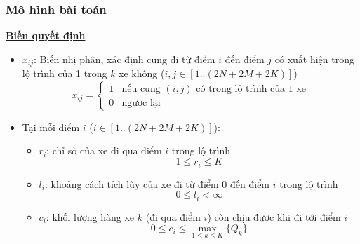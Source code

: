\documentclass{beamer}
\begin{document}
	\begin{frame}
		\frametitle{Mô hình bài toán}
		\textbf{\underline{Biến quyết định}}
		\begin{itemize}
			\item $x_{ij}$: Biến nhị phân, xác định cung đi từ điểm $i$ đến điểm $j$ có xuất hiện trong lộ trình của 1 trong $k$ xe không ($i,j\in [1..(2N+2M+2K)]$)
			\begin{equation}
				x_{ij} = 
				\begin{cases}
				1 & \text{nếu cung $(i,j)$ có trong lộ trình của 1 xe}\\
				0 & \text{ngược lại}
				\end{cases}
			\end{equation}
			\item Tại mỗi điểm $i$ ($i\in [1..(2N+2M+2K)]$):
			\begin{itemize}
				\item $r_i$: chỉ số của xe đi qua điểm $i$ trong lộ trình
					\begin{equation}
					1\leq r_i\leq K
					\end{equation}
				\item $l_i$: khoảng cách tích lũy của xe đi từ điểm $0$ đến điểm $i$ trong lộ trình
					\begin{equation}
					0\leq l_i < \infty
					\end{equation}
				\item $c_i$: khối lượng hàng xe $k$ (đi qua điểm $i$) còn chịu được khi đi tới điểm $i$
					\begin{equation}
					0\leq c_i\leq \max _{1\leq k\leq K} \{Q_k\}
					\end{equation}
			\end{itemize}
		\end{itemize}
	\end{frame}
\end{document}
